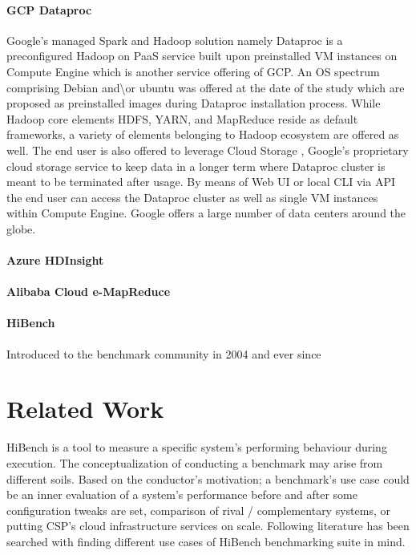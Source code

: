 \documentclass[review]{elsarticle}
\begin{document}
\paragraph{GCP Dataproc \cite{noauthor_dataproc_nodate}} Google's managed Spark and Hadoop solution namely Dataproc is a preconfigured Hadoop on PaaS service built upon preinstalled VM instances on Compute Engine \cite{noauthor_compute_nodate} which is another service offering of GCP. An OS spectrum comprising Debian and\textbackslash or ubuntu was offered at the date of the study which are proposed as preinstalled images during Dataproc installation process. While Hadoop core elements HDFS, YARN, and MapReduce reside as default frameworks, a variety of elements belonging to Hadoop ecosystem are offered as well. The end user is also offered to leverage Cloud Storage \cite{noauthor_cloud_nodate}, Google's proprietary cloud storage service to keep data in a longer term where Dataproc cluster is meant to be terminated after usage. By means of Web UI or local CLI via API the end user can access the Dataproc cluster as well as single VM instances within Compute Engine. Google offers a large number of data centers around the globe.

\paragraph{Azure HDInsight \cite{noauthor_azure_nodate}}

\paragraph{Alibaba Cloud e-MapReduce \cite{noauthor_e-mapreduce_nodate}}

\paragraph{HiBench \cite{noauthor_intel-bigdatahibench_2021}} Introduced to the benchmark community in 2004 and ever since




\section{Related Work}
HiBench is a tool to measure a specific system’s performing behaviour during execution. The conceptualization of conducting a benchmark may arise from different soils. Based on the conductor’s motivation; a benchmark’s use case could be an inner evaluation of a system’s performance before and after some configuration tweaks are set, comparison of rival / complementary systems, or putting CSP’s cloud infrastructure services on scale. Following literature has been searched with finding different use cases of HiBench benchmarking suite in mind. 
\end{document}
